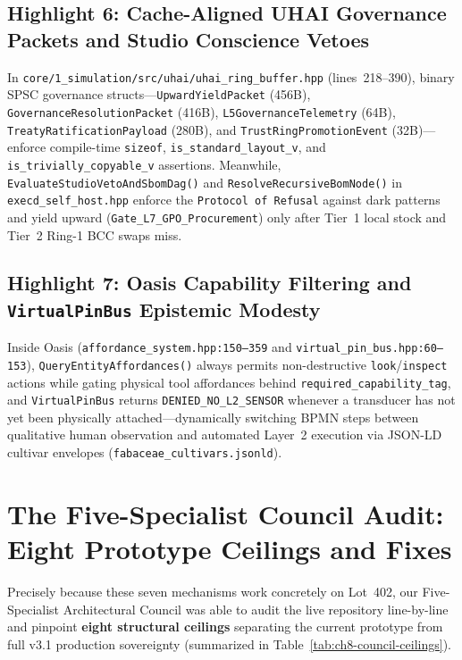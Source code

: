 \subsection{Highlight 6: Cache-Aligned UHAI Governance Packets and Studio Conscience Vetoes}

In \texttt{core/1\_simulation/src/uhai/uhai\_ring\_buffer.hpp} (lines~218--390), binary SPSC
governance structs---\texttt{UpwardYieldPacket} (456B), \texttt{GovernanceResolutionPacket}
(416B), \texttt{L5GovernanceTelemetry} (64B), \texttt{TreatyRatificationPayload} (280B), and
\texttt{TrustRingPromotionEvent} (32B)---enforce compile-time \texttt{sizeof},
\texttt{is\_standard\_layout\_v}, and \texttt{is\_trivially\_copyable\_v} assertions. Meanwhile,
\texttt{EvaluateStudioVetoAndSbomDag()} and \texttt{ResolveRecursiveBomNode()} in
\texttt{execd\_self\_host.hpp} enforce the \texttt{Protocol of Refusal} against dark patterns
and yield upward (\texttt{Gate\_L7\_GPO\_Procurement}) only after Tier~1 local stock and Tier~2
Ring-1 BCC swaps miss.

\subsection{Highlight 7: Oasis Capability Filtering and \texttt{VirtualPinBus} Epistemic Modesty}

Inside Oasis (\texttt{affordance\_system.hpp:150--359} and \texttt{virtual\_pin\_bus.hpp:60--153}),
\texttt{QueryEntityAffordances()} always permits non-destructive \texttt{look}/\texttt{inspect}
actions while gating physical tool affordances behind \texttt{required\_capability\_tag}, and
\texttt{VirtualPinBus} returns \texttt{DENIED\_NO\_L2\_SENSOR} whenever a transducer has not yet
been physically attached---dynamically switching BPMN steps between qualitative human observation
and automated Layer~2 execution via JSON-LD cultivar envelopes (\texttt{fabaceae\_cultivars.jsonld}).

\section{The Five-Specialist Council Audit: Eight Prototype Ceilings and Fixes}
\label{sec:ch8-council-audit}

Precisely because these seven mechanisms work concretely on Lot~402, our Five-Specialist
Architectural Council was able to audit the live repository line-by-line and pinpoint
\textbf{eight structural ceilings} separating the current prototype from full v3.1 production
sovereignty (summarized in Table~\ref{tab:ch8-council-ceilings}).

